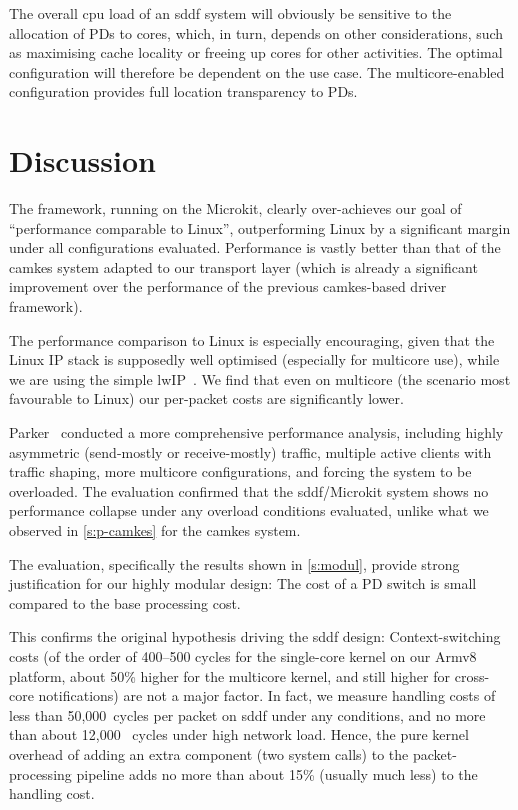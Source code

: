 \documentclass[a4paper,12pt]{report}
\begin{document}
The overall \gls{cpu} load of an \gls{sddf} system will obviously be sensitive to
the allocation of PDs to cores, which, in turn, depends on other
considerations, such as maximising cache locality or freeing up cores
for other activities. The optimal configuration will therefore be
dependent on the use case. The multicore-enabled configuration
provides full location transparency to PDs.

\section{Discussion}\label{s:perf-disc}

The framework, running on the Microkit, clearly over-achieves our goal
of ``performance comparable to Linux'', outperforming Linux by a
significant margin under all configurations evaluated. Performance is vastly better than that
of the \gls{camkes} system adapted to our transport layer (which is already
a significant improvement over the performance of the previous \gls{camkes}-based
driver framework).

The performance comparison to Linux is especially encouraging, given
that the Linux IP stack is supposedly well optimised (especially for
multicore use), while we are using the simple
lwIP~\citep{Dunkels_01}. We find that even on multicore (the scenario
most favourable to Linux) our per-packet costs are significantly lower.

Parker~\citep{Parker:bsc} conducted a more comprehensive performance
analysis, including highly asymmetric (send-mostly or receive-mostly)
traffic, multiple active clients with traffic shaping, more multicore
configurations, and forcing the system to be overloaded.
The evaluation confirmed that the \gls{sddf}/Microkit system shows no
performance collapse under any overload conditions evaluated, unlike what we observed in
\autoref{s:p-camkes} for the \gls{camkes} system.

The evaluation, specifically the results shown in \autoref{s:modul},
provide strong justification for our highly modular design: The cost
of a PD switch is small compared to the base processing cost.

This confirms the original hypothesis driving
the \gls{sddf} design: Context-switching costs (of the order of 400--500 cycles
for the single-core kernel on our Armv8 platform, about 50\% higher
for the multicore kernel, and still higher for cross-core
notifications) are not a major factor. In fact, we measure
handling costs of less than 50,000~cycles per packet on \gls{sddf} under any
conditions, and no more than about 12,000~ cycles under high network
load. Hence, the pure kernel overhead of adding an extra component
(two system calls) to
the packet-processing pipeline adds no more than about 15\% (usually
much less) to the handling cost.
\end{document}
